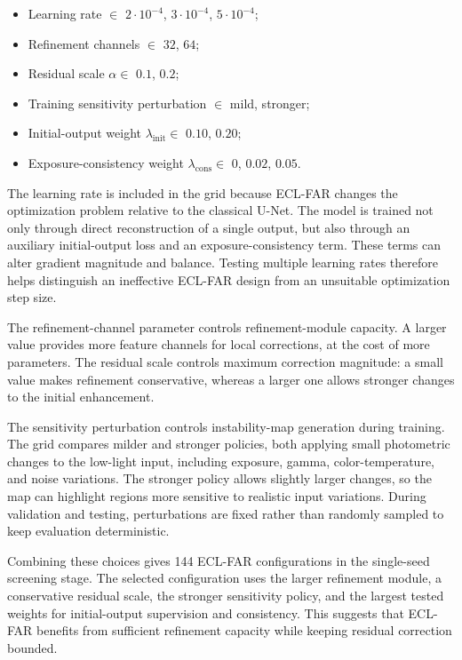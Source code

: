 \begin{itemize}[topsep=5pt]
	\item Learning rate $\in$ $2{\cdot}10^{-4}$, $3{\cdot}10^{-4}$, $5{\cdot}10^{-4}$;
	\item Refinement channels $\in$ $32$, $64$;
	\item Residual scale $\alpha \in$ $0.1$, $0.2$;
	\item Training sensitivity perturbation $\in$ mild, stronger;
	\item Initial-output weight $\lambda_{\mathrm{init}} \in$ $0.10$, $0.20$;
	\item Exposure-consistency weight $\lambda_{\mathrm{cons}} \in$ $0$, $0.02$, $0.05$.
\end{itemize}

The learning rate is included in the grid because ECL-FAR changes the optimization problem relative to the classical U-Net. The model is trained not only through direct reconstruction of a single output, but also through an auxiliary initial-output loss and an exposure-consistency term. These terms can alter gradient magnitude and balance. Testing multiple learning rates therefore helps distinguish an ineffective ECL-FAR design from an unsuitable optimization step size.

The refinement-channel parameter controls refinement-module capacity. A larger value provides more feature channels for local corrections, at the cost of more parameters. The residual scale controls maximum correction magnitude: a small value makes refinement conservative, whereas a larger one allows stronger changes to the initial enhancement.

The sensitivity perturbation controls instability-map generation during training. The grid compares milder and stronger policies, both applying small photometric changes to the low-light input, including exposure, gamma, color-temperature, and noise variations. The stronger policy allows slightly larger changes, so the map can highlight regions more sensitive to realistic input variations. During validation and testing, perturbations are fixed rather than randomly sampled to keep evaluation deterministic.

Combining these choices gives 144 ECL-FAR configurations in the single-seed screening stage. The selected configuration uses the larger refinement module, a conservative residual scale, the stronger sensitivity policy, and the largest tested weights for initial-output supervision and consistency. This suggests that ECL-FAR benefits from sufficient refinement capacity while keeping residual correction bounded.

